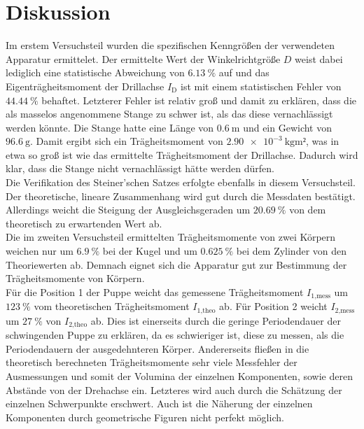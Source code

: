 \section{Diskussion}
\label{sec:Diskussion}

Im erstem Versuchsteil wurden die spezifischen Kenngrößen der verwendeten 
Apparatur ermittelet. Der ermittelte Wert der Winkelrichtgröße $D$ weist dabei 
lediglich eine statistische Abweichung von $\SI{6.13}{\percent}$ auf und das 
Eigenträgheitsmoment der Drillachse $I_\text{D}$ ist mit einem statistischen 
Fehler von $\SI{44.44}{\percent}$ behaftet. Letzterer Fehler ist relativ groß 
und damit zu erklären, dass die als masselos angenommene Stange zu 
schwer ist, als das diese vernachlässigt werden könnte. Die Stange hatte eine 
Länge von $\SI{0.6}{\meter}$ und ein Gewicht von $\SI{96.6}{\gram}$. Damit ergibt
sich ein Trägheitsmoment von $\SI{2.90e-3}{\kilo\gram\meter²}$, was in etwa so groß
ist wie das ermittelte Trägheitsmoment der Drillachse. Dadurch wird klar, dass die
Stange nicht vernachlässigt hätte werden dürfen. \\
Die Verifikation des Steiner’schen Satzes erfolgte ebenfalls in diesem Versuchsteil. Der
theoretische, lineare Zusammenhang wird gut durch die Messdaten bestätigt. Allerdings weicht
die Steigung der Ausgleichsgeraden um $\SI{20.69}{\percent}$ von dem theoretisch zu erwartenden 
Wert ab. \\
Die im zweiten Versuchsteil ermittelten Trägheitsmomente von zwei Körpern weichen nur um
$\SI{6.9}{\percent}$ bei der Kugel und um $\SI{0.625}{\percent}$ bei dem Zylinder von den 
Theoriewerten ab. Demnach eignet sich die Apparatur gut zur Bestimmung der Trägheitsmomente
von Körpern. \\
Für die Position 1 der Puppe weicht das gemessene Trägheitsmoment $I_\text{1,mess}$ um 
$\SI{123}{\percent}$ vom theoretischen Trägheitsmoment $I_\text{1,theo}$ ab. Für Position 2
weicht $I_\text{2,mess}$ um $\SI{27}{\percent}$ von $I_\text{2,theo}$ ab.
Dies ist einerseits durch die geringe Periodendauer der schwingenden Puppe zu erklären,
da es schwieriger ist, diese zu messen, als die Periodendauern der ausgedehnteren Körper.
Andererseits fließen in die theoretisch berechneten Trägheitsmomente sehr viele Messfehler
der Ausmessungen und somit der Volumina der einzelnen Komponenten, sowie deren Abstände 
von der Drehachse ein.
Letzteres wird auch durch die Schätzung der einzelnen Schwerpunkte erschwert. 
Auch ist die Näherung der einzelnen Komponenten durch geometrische Figuren nicht
perfekt möglich.
